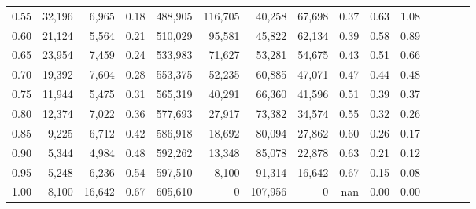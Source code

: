 \begin{tabular}{rrrcrrrrrrrrrrr}
0.55 &  32,196 &   6,965 &                                       0.18 &  488,905 &  116,705 &   40,258 &   67,698 &  0.37 &  0.63 &                         1.08 \\
0.60 &  21,124 &   5,564 &                                       0.21 &  510,029 &   95,581 &   45,822 &   62,134 &  0.39 &  0.58 &                         0.89 \\
0.65 &  23,954 &   7,459 &                                       0.24 &  533,983 &   71,627 &   53,281 &   54,675 &  0.43 &  0.51 &                         0.66 \\
0.70 &  19,392 &   7,604 &                                       0.28 &  553,375 &   52,235 &   60,885 &   47,071 &  0.47 &  0.44 &                         0.48 \\
0.75 &  11,944 &   5,475 &                                       0.31 &  565,319 &   40,291 &   66,360 &   41,596 &  0.51 &  0.39 &                         0.37 \\
0.80 &  12,374 &   7,022 &                                       0.36 &  577,693 &   27,917 &   73,382 &   34,574 &  0.55 &  0.32 &                         0.26 \\
0.85 &   9,225 &   6,712 &                                       0.42 &  586,918 &   18,692 &   80,094 &   27,862 &  0.60 &  0.26 &                         0.17 \\
0.90 &   5,344 &   4,984 &                                       0.48 &  592,262 &   13,348 &   85,078 &   22,878 &  0.63 &  0.21 &                         0.12 \\
0.95 &   5,248 &   6,236 &                                       0.54 &  597,510 &    8,100 &   91,314 &   16,642 &  0.67 &  0.15 &                         0.08 \\
1.00 &   8,100 &  16,642 &                                       0.67 &  605,610 &        0 &  107,956 &        0 &   nan &  0.00 &                         0.00 \\
\bottomrule
\end{tabular}
